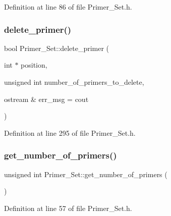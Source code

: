 Definition at line 86 of file Primer\+\_\+\+Set.\+h.

\mbox{\label{class_primer___set_a1285be11e09dff32a28e8c36d01175c5}} 
\subsubsection{\texorpdfstring{delete\+\_\+primer()}{delete\_primer()}}
{\footnotesize\ttfamily bool Primer\+\_\+\+Set\+::delete\+\_\+primer (\begin{DoxyParamCaption}\item[{int $\ast$}]{position,  }\item[{unsigned int}]{number\+\_\+of\+\_\+primers\+\_\+to\+\_\+delete,  }\item[{ostream \&}]{err\+\_\+msg = {\ttfamily cout} }\end{DoxyParamCaption})}



Definition at line 295 of file Primer\+\_\+\+Set.\+h.

\mbox{\label{class_primer___set_af9cc2185ff8cb758f383481d138faf8f}} 
\subsubsection{\texorpdfstring{get\+\_\+number\+\_\+of\+\_\+primers()}{get\_number\_of\_primers()}}
{\footnotesize\ttfamily unsigned int Primer\+\_\+\+Set\+::get\+\_\+number\+\_\+of\+\_\+primers (\begin{DoxyParamCaption}{ }\end{DoxyParamCaption})\hspace{0.3cm}{\ttfamily [inline]}}



Definition at line 57 of file Primer\+\_\+\+Set.\+h.


